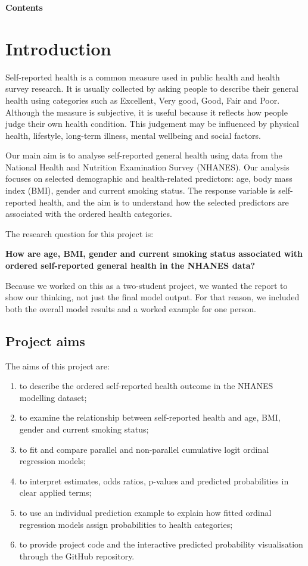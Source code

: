\documentclass{article}
\providecommand{\tightlist}{%
  \setlength{\itemsep}{0pt}\setlength{\parskip}{0pt}}
\begin{document}
\newpage
\begin{center}
\textbf{Contents}
\end{center}
\tableofcontents
\newpage

\section{Introduction}\label{introduction}

Self-reported health is a common measure used in public health and
health survey research. It is usually collected by asking people to
describe their general health using categories such as Excellent, Very
good, Good, Fair and Poor. Although the measure is subjective, it is
useful because it reflects how people judge their own health condition.
This judgement may be influenced by physical health, lifestyle,
long-term illness, mental wellbeing and social factors.

Our main aim is to analyse self-reported general health using data from
the National Health and Nutrition Examination Survey (NHANES). Our
analysis focuses on selected demographic and health-related predictors:
age, body mass index (BMI), gender and current smoking status. The
response variable is self-reported health, and the aim is to understand
how the selected predictors are associated with the ordered health
categories.

The research question for this project is:

\textbf{How are age, BMI, gender and current smoking status associated
with ordered self-reported general health in the NHANES data?}

Because we worked on this as a two-student project, we wanted the report
to show our thinking, not just the final model output. For that reason,
we included both the overall model results and a worked example for one
person.

\subsection{Project aims}\label{project-aims}

The aims of this project are:

\begin{enumerate}
\def\labelenumi{\arabic{enumi}.}
\tightlist
\item
  to describe the ordered self-reported health outcome in the NHANES
  modelling dataset;
\item
  to examine the relationship between self-reported health and age, BMI,
  gender and current smoking status;
\item
  to fit and compare parallel and non-parallel cumulative logit ordinal
  regression models;
\item
  to interpret estimates, odds ratios, p-values and predicted
  probabilities in clear applied terms;
\item
  to use an individual prediction example to explain how fitted ordinal
  regression models assign probabilities to health categories;
\item
  to provide project code and the interactive predicted probability
  visualisation through the GitHub repository.
\end{enumerate}
\end{document}
